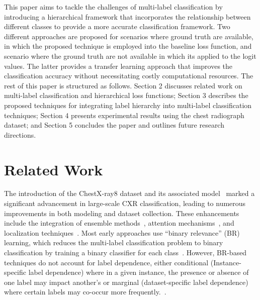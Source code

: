 This paper aims to tackle the challenges of multi-label classification by introducing a hierarchical framework that incorporates the relationship between different classes to provide a more accurate classification framework. Two different approaches are proposed for scenarios where ground truth are available, in which the proposed technique is employed into the baseline loss function, and scenario where the ground truth are not available in which its applied to the logit values. The latter provides a transfer learning approach that improves the classification accuracy without necessitating costly computational resources. The rest of this paper is structured as follows. Section 2 discusses related work on multi-label classification and hierarchical loss functions; Section 3 describes the proposed techniques for integrating label hierarchy into multi-label classification techniques; Section 4 presents experimental results using the chest radiograph dataset; and Section 5 concludes the paper and outlines future research directions.

\section{Related Work}

The introduction of the ChestX-ray8 dataset and its associated model~\cite{wang_ChestXRay8_2017} marked a significant advancement in large-scale CXR classification, leading to numerous improvements in both modeling and dataset collection. These enhancements include the integration of ensemble methods~\cite{islam_Abnormality_2017}, attention mechanisms~\cite{guan_Diagnose_2018,liu_SDFN_2019}, and localization techniques~\cite{cai_Iterative_2018,guendel_MultiTask_2019,li_Thoracic_2018,yan_Weakly_2018}. Most early approaches use ``binary relevance'' (BR) learning, which reduces the multi-label classification problem to binary classification by training a binary classifier for each class~\cite{zhang_Review_2014}. However, BR-based techniques do not account for label dependence, either conditional (Instance-specific label dependence) where in a given instance, the presence or absence of one label may impact another's or marginal (dataset-specific label dependence) where certain labels may co-occur more frequently.~\cite{dembczynski_Label_2012}.

